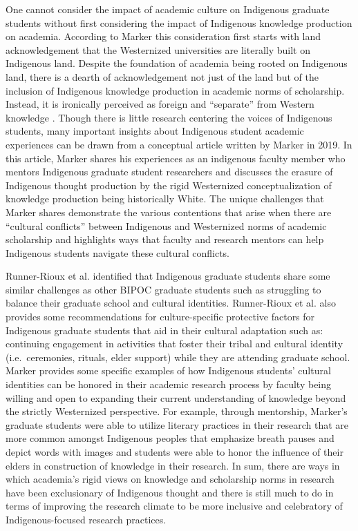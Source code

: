 \documentclass[
  11pt,
]{book}
\begin{document}
One cannot consider the impact of academic culture on Indigenous graduate students without first considering the impact of Indigenous knowledge production on academia. According to Marker \citeyearpar{marker_indigenous_2019} this consideration first starts with land acknowledgement that the Westernized universities are literally built on Indigenous land. Despite the foundation of academia being rooted on Indigenous land, there is a dearth of acknowledgement not just of the land but of the inclusion of Indigenous knowledge production in academic norms of scholarship. Instead, it is ironically perceived as foreign and ``separate'' from Western knowledge \citep{marker_indigenous_2019}. Though there is little research centering the voices of Indigenous students, many important insights about Indigenous student academic experiences can be drawn from a conceptual article written by Marker in 2019. In this article, Marker \citeyearpar{marker_indigenous_2019} shares his experiences as an indigenous faculty member who mentors Indigenous graduate student researchers and discusses the erasure of Indigenous thought production by the rigid Westernized conceptualization of knowledge production being historically White. The unique challenges that Marker \citeyearpar{marker_indigenous_2019} shares demonstrate the various contentions that arise when there are ``cultural conflicts'' between Indigenous and Westernized norms of academic scholarship and highlights ways that faculty and research mentors can help Indigenous students navigate these cultural conflicts.

Runner-Rioux et al. \citeyearpar{runner-rioux_influence_2018} identified that Indigenous graduate students share some similar challenges as other BIPOC graduate students such as struggling to balance their graduate school and cultural identities. Runner-Rioux et al. \citeyearpar{runner-rioux_influence_2018} also provides some recommendations for culture-specific protective factors for Indigenous graduate students that aid in their cultural adaptation such as: continuing engagement in activities that foster their tribal and cultural identity (i.e.~ceremonies, rituals, elder support) while they are attending graduate school. Marker \citeyearpar{marker_indigenous_2019} provides some specific examples of how Indigenous students' cultural identities can be honored in their academic research process by faculty being willing and open to expanding their current understanding of knowledge beyond the strictly Westernized perspective. For example, through mentorship, Marker's graduate students were able to utilize literary practices in their research that are more common amongst Indigenous peoples that emphasize breath pauses and depict words with images and students were able to honor the influence of their elders in construction of knowledge in their research. In sum, there are ways in which academia's rigid views on knowledge and scholarship norms in research have been exclusionary of Indigenous thought and there is still much to do in terms of improving the research climate to be more inclusive and celebratory of Indigenous-focused research practices.
\end{document}
